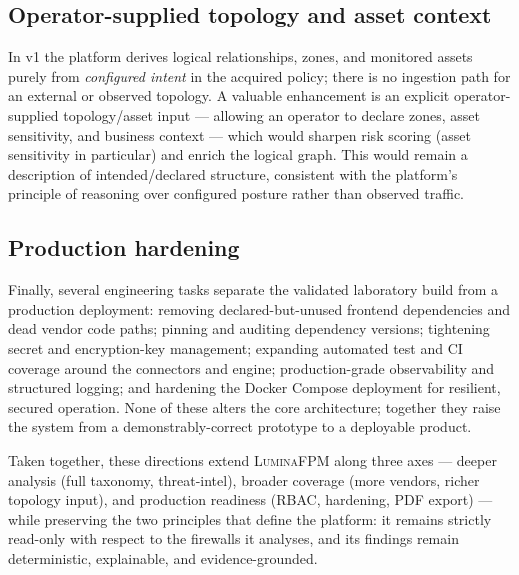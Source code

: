 \subsection{Operator-supplied topology and asset context}
\label{sec:ch5-topology-input}

In v1 the platform derives logical relationships, zones, and monitored assets purely from \emph{configured intent} in the acquired policy; there is no ingestion path for an external or observed topology. A valuable enhancement is an explicit operator-supplied topology/asset input --- allowing an operator to declare zones, asset sensitivity, and business context --- which would sharpen risk scoring (asset sensitivity in particular) and enrich the logical graph. This would remain a description of intended/declared structure, consistent with the platform's principle of reasoning over configured posture rather than observed traffic.

\subsection{Production hardening}
\label{sec:ch5-hardening}

Finally, several engineering tasks separate the validated laboratory build from a production deployment: removing declared-but-unused frontend dependencies and dead vendor code paths; pinning and auditing dependency versions; tightening secret and encryption-key management; expanding automated test and CI coverage around the connectors and engine; production-grade observability and structured logging; and hardening the Docker Compose deployment for resilient, secured operation. None of these alters the core architecture; together they raise the system from a demonstrably-correct prototype to a deployable product.


Taken together, these directions extend \textsc{LuminaFPM} along three axes --- deeper analysis (full taxonomy, threat-intel), broader coverage (more vendors, richer topology input), and production readiness (RBAC, hardening, PDF export) --- while preserving the two principles that define the platform: it remains strictly read-only with respect to the firewalls it analyses, and its findings remain deterministic, explainable, and evidence-grounded.
